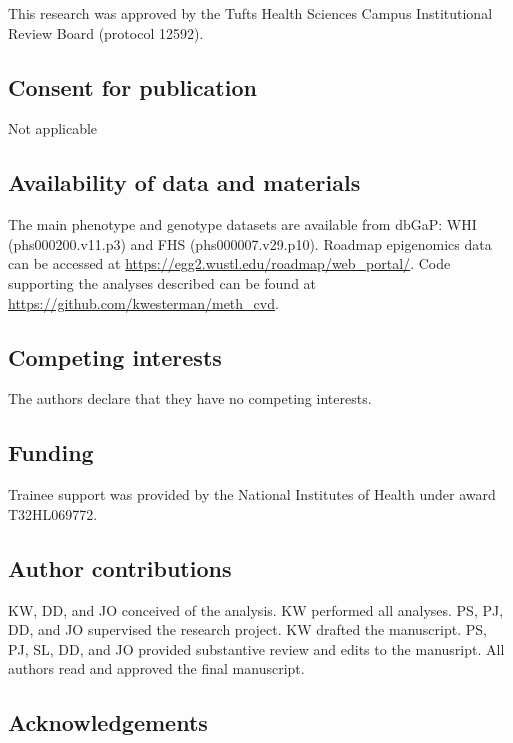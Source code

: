 \documentclass[]{bmcart}
\theoremstyle{definition}
\theoremstyle{definition}
\theoremstyle{definition}
\theoremstyle{remark}
\begin{document}
This research was approved by the Tufts Health Sciences Campus
Institutional Review Board (protocol 12592).

\subsection{Consent for publication}\label{consent-for-publication}

Not applicable

\subsection{Availability of data and
materials}\label{availability-of-data-and-materials}

The main phenotype and genotype datasets are available from dbGaP: WHI
(phs000200.v11.p3) and FHS (phs000007.v29.p10). Roadmap epigenomics data
can be accessed at \url{https://egg2.wustl.edu/roadmap/web_portal/}.
Code supporting the analyses described can be found at
\url{https://github.com/kwesterman/meth_cvd}.

\subsection{Competing interests}\label{competing-interests}

The authors declare that they have no competing interests.

\subsection{Funding}\label{funding}

Trainee support was provided by the National Institutes of Health under
award T32HL069772.

\subsection{Author contributions}\label{author-contributions}

KW, DD, and JO conceived of the analysis. KW performed all analyses. PS,
PJ, DD, and JO supervised the research project. KW drafted the
manuscript. PS, PJ, SL, DD, and JO provided substantive review and edits
to the manusript. All authors read and approved the final manuscript.

\subsection{Acknowledgements}\label{acknowledgements}
\end{document}

